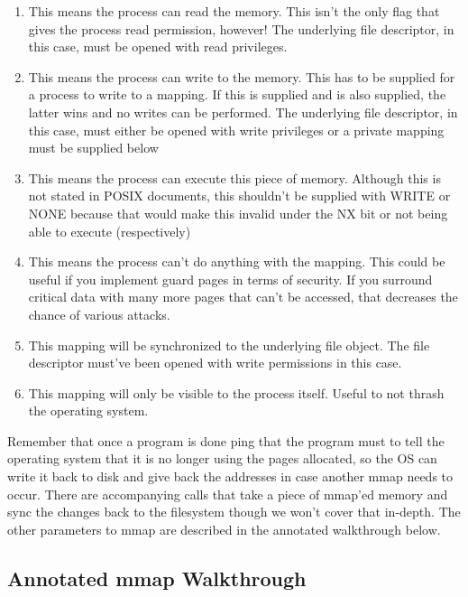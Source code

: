 \begin{enumerate}
	\item {} This means the process can read the memory. This isn't the only flag that gives the process read permission, however! The underlying file descriptor, in this case, must be opened with read privileges.
	\item {} This means the process can write to the memory. This has to be supplied for a process to write to a mapping. If this is supplied and  is also supplied, the latter wins and no writes can be performed. The underlying file descriptor, in this case, must either be opened with write privileges or a private mapping must be supplied below
	\item {} This means the process can execute this piece of memory. Although this is not stated in POSIX documents, this shouldn't be supplied with WRITE or NONE because that would make this invalid under the NX bit or not being able to execute (respectively)
	\item {} This means the process can't do anything with the mapping. This could be useful if you implement guard pages in terms of security. If you surround critical data with many more pages that can't be accessed, that decreases the chance of various attacks.
	\item {} This mapping will be synchronized to the underlying file object. The file descriptor must've been opened with write permissions in this case.
	\item {} This mapping will only be visible to the process itself. Useful to not thrash the operating system.
\end{enumerate}
	 
Remember that once a program is done ping that the program must  to tell the operating system that it is no longer using the pages allocated, so the OS can write it back to disk and give back the addresses in case another mmap needs to occur.
There are accompanying calls  that take a piece of mmap'ed memory and sync the changes back to the filesystem though we won't cover that in-depth.
The other parameters to mmap are described in the annotated walkthrough below.
	 
\subsection{Annotated mmap Walkthrough}
	 

